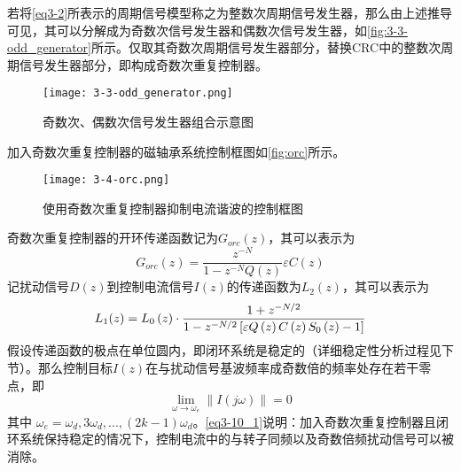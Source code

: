 \documentclass[
  lang=cn,
  degree=master,
  openany,oneside
]{nuaathesis}
\begin{document}
若将\autoref{eq3-2}所表示的周期信号模型称之为整数次周期信号发生器，那么由上述推导可见，其可以分解成为奇数次信号发生器和偶数次信号发生器，如\autoref{fig:3-3-odd_generator}所示。仅取其奇数次周期信号发生器部分，替换CRC中的整数次周期信号发生器部分，即构成奇数次重复控制器。
\begin{figure}
	\texttt{[image: 3-3-odd\_generator.png]}
	\caption{奇数次、偶数次信号发生器组合示意图}
	\label{fig:3-3-odd_generator}
\end{figure}
加入奇数次重复控制器的磁轴承系统控制框图如\autoref{fig:orc}所示。
\begin{figure}[h!]
	\texttt{[image: 3-4-orc.png]}
	\caption{使用奇数次重复控制器抑制电流谐波的控制框图}
	\label{fig:orc}
\end{figure}
奇数次重复控制器的开环传递函数记为$G_{orc}(z)$，其可以表示为
\begin{equation}
G_{orc}(z)=\dfrac{z^{-N}}{1-z^{-N}Q(z)}\varepsilon C(z)
\end{equation}
记扰动信号$D(z)$到控制电流信号$I(z)$的传递函数为$L_2(z)$，其可以表示为
\begin{equation}
L_1(z)={L_0}\left( z \right) \cdot {{1 + {z^{ - N/2}}} \over {1 - {z^{ - N/2}}\left[ {\varepsilon Q\left( z \right)C\left( z \right){S_0}\left( z \right) - 1} \right]}}
\end{equation}
假设传递函数的极点在单位圆内，即闭环系统是稳定的（详细稳定性分析过程见下节）。那么控制目标$I(z)$在与扰动信号基波频率成奇数倍的频率处存在若干零点，即
\begin{equation}
\label{eq3-10_1}
\mathop {\lim }\limits_{\omega  \to {\omega _e}} \left\| {I\left( {j\omega } \right)} \right\| = 0
\end{equation}
其中 $\omega _e=\omega _d, 3\omega _d,...,(2k-1)\omega _d$。\autoref{eq3-10_1}说明：加入奇数次重复控制器且闭环系统保持稳定的情况下，控制电流中的与转子同频以及奇数倍频扰动信号可以被消除。
\end{document}
